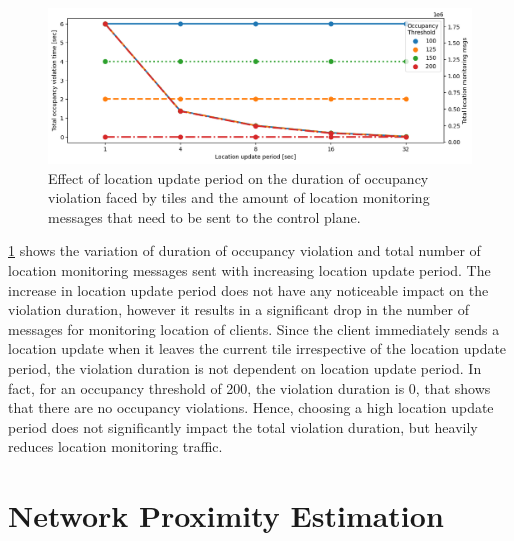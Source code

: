 \begin{figure}
\centering
\includegraphics[width=\linewidth]{figures/design_space/spatial/loc_update_period_tradeoff.png}
\caption{Effect of location update period on the duration of occupancy violation faced by tiles and the amount of location monitoring messages that need to be sent to the control plane.}
\label{fig:location_update_period}
\end{figure}
\cref{fig:location_update_period} shows the variation of duration of occupancy violation and total number of location monitoring messages sent with increasing location update period. The increase in location update period does not have any noticeable impact on the violation duration, however it results in a significant drop in the number of messages for monitoring location of clients. Since the client immediately sends a location update when it leaves the current tile irrespective of the location update period, the violation duration is not dependent on location update period. In fact, for an occupancy threshold of 200, the violation duration is 0, that shows that there are no occupancy violations. Hence, choosing a high location update period does not significantly impact the total violation duration, but heavily reduces location monitoring traffic.

\section{Network Proximity Estimation}

